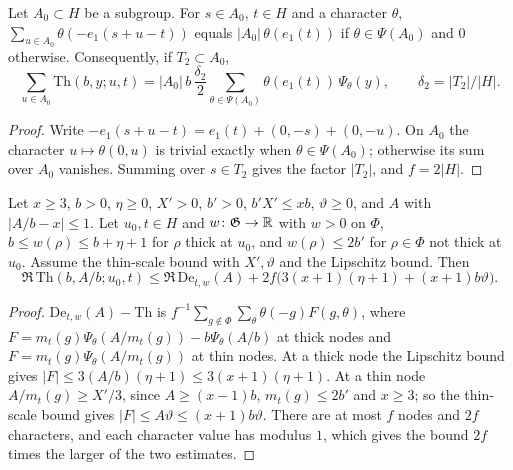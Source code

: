 \begin{lemma}\label{bal:sum-A}
Let $A_0\subset H$ be a subgroup. For $s\in A_0$, $t\in H$ and a character $\theta$,
$\sum_{u\in A_0}\theta(-e_1(s+u-t))$ equals $|A_0|\,\theta(e_1(t))$ if $\theta\in\Psi(A_0)$ and $0$ otherwise. Consequently, if $T_2\subset A_0$,
\[\sum_{u\in A_0}\mathrm{Th}(b,y;u,t)=|A_0|\,b\,\frac{\delta_2}2\sum_{\theta\in\Psi(A_0)}\theta(e_1(t))\,\Psi_{\theta}(y),\qquad \delta_2=|T_2|/|H|.\]
\end{lemma}
\begin{proof}
Write $-e_1(s+u-t)=e_1(t)+(0,-s)+(0,-u)$. On $A_0$ the character $u\mapsto\theta(0,u)$ is trivial exactly when $\theta\in\Psi(A_0)$; otherwise its sum over $A_0$ vanishes. Summing over $s\in T_2$ gives the factor $|T_2|$, and $f=2|H|$.
\end{proof}

\begin{lemma}\label{bal:th-le}
Let $x\ge3$, $b>0$, $\eta\ge0$, $X'>0$, $b'>0$, $b'X'\le xb$, $\vartheta\ge0$, and $A$ with $|A/b-x|\le1$. Let $u_0,t\in H$ and $w\colon\mathfrak G\to\mathbb{R}$ with $w>0$ on $\Phi$, $b\le w(\rho)\le b+\eta+1$ for $\rho$ thick at $u_0$, and $w(\rho)\le2b'$ for $\rho\in\Phi$ not thick at $u_0$. Assume the thin-scale bound with $X',\vartheta$ and the Lipschitz bound. Then
\[\Re\,\mathrm{Th}(b,A/b;u_0,t)\le\Re\,\mathrm{De}_{t,w}(A)+2f\bigl(3(x+1)(\eta+1)+(x+1)b\vartheta\bigr).\]
\end{lemma}
\begin{proof}
$\mathrm{De}_{t,w}(A)-\mathrm{Th}$ is $f^{-1}\sum_{g\notin\Phi}\sum_{\theta}\theta(-g)F(g,\theta)$, where $F=m_t(g)\Psi_{\theta}(A/m_t(g))-b\Psi_{\theta}(A/b)$ at thick nodes and $F=m_t(g)\Psi_{\theta}(A/m_t(g))$ at thin nodes. At a thick node the Lipschitz bound gives $|F|\le3(A/b)(\eta+1)\le3(x+1)(\eta+1)$. At a thin node $A/m_t(g)\ge X'/3$, since $A\ge(x-1)b$, $m_t(g)\le2b'$ and $x\ge3$; so the thin-scale bound gives $|F|\le A\vartheta\le(x+1)b\vartheta$. There are at most $f$ nodes and $2f$ characters, and each character value has modulus $1$, which gives the bound $2f$ times the larger of the two estimates.
\end{proof}

